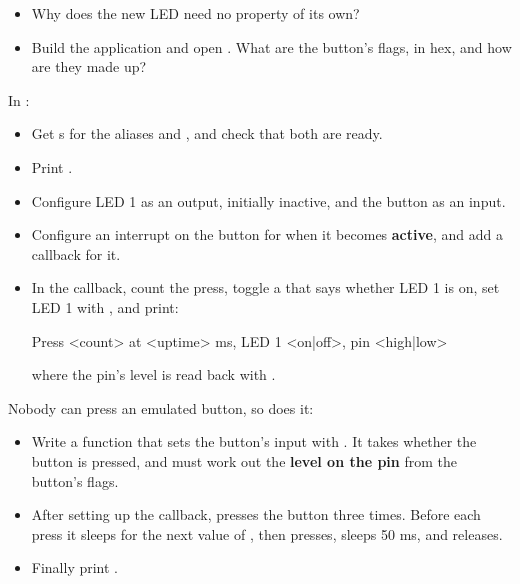 \begin{itemize}
  \item Why does the new LED need no  property of its own?
  \item Build the application and open . What are the button’s flags, in hex,
    and how are they made up?
\end{itemize}

\label{c2:ex:2.2}

In :

\begin{itemize}
  \item Get s for the aliases  and , and check that both are ready.
  \item Print .
  \item Configure LED 1 as an output, initially inactive, and the button as an input.
  \item Configure an interrupt on the button for when it becomes \textbf{active}, and add a callback for it.
  \item In the callback, count the press, toggle a  that says whether LED 1 is on, set LED 1 with
    , and print:
\begin{console}
Press <count> at <uptime> ms, LED 1 <on|off>, pin <high|low>
\end{console}
where the pin’s level is read back with .
\end{itemize}

\label{c2:ex:2.3}

Nobody can press an emulated button, so  does it:

\begin{itemize}
  \item Write a function  that sets the button’s input with
    . It takes whether the button is pressed, and must work out the
    \textbf{level on the pin} from the button’s flags.
  \item After setting up the callback,  presses the button three times. Before each press it
    sleeps for the next value of , then presses,
    sleeps 50 ms, and releases.
  \item Finally print .
\end{itemize}


